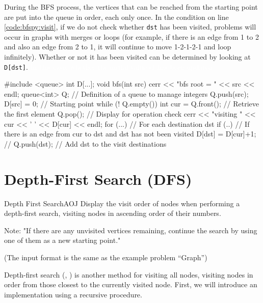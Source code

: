 During the BFS process, the vertices that can be reached from the starting point are put into the queue in order, each only once.
In the condition on line \ref{code:bfspy:visit}, if we do not check whether \texttt{dst} has been visited, problems will occur in graphs with merges or loops (for example, if there is an edge from 1 to 2 and also an edge from 2 to 1, it will continue to move 1-2-1-2-1 and loop infinitely). Whether or not it has been visited can be determined by looking at \texttt{D[dst]}. \textcolor{white}{In this case, whether the initial value -1 has been updated.}

\begin{cbox}[emph={queue,bfs,Q}]
#include <queue>
int D[...];
void bfs(int src) {
    cerr << "bfs root = " << src << endl;
    queue<int> Q; // Definition of a queue to manage integers
    Q.push(src);
    D[src] = 0; // Starting point
    while (! Q.empty()) {
        int cur = Q.front(); // Retrieve the first element
        Q.pop();
        // Display for operation check
        cerr << "visiting " << cur << ' ' << D[cur] << endl;
        for (...) { // For each destination dst
            if (..) { // If there is an edge from cur to dst and dst has not been visited
                D[dst] = D[cur]+1; // 
                Q.push(dst); // Add dst to the visit destinations
            } 
        }
    }
}  
\end{cbox}
\section{Depth-First Search (DFS)}\label{section:dfs}

\begin{psbox}{Depth First Search}{AOJ}
Display the visit order of nodes when performing a depth-first search, visiting nodes in ascending order of their numbers.

Note: "If there are any unvisited vertices remaining, continue the search by using one of them as a new starting point."

(The input format is the same as the example problem ``Graph'')

\end{psbox}

Depth-first search (\pcaojbook[pp.~273--], \pccbook[p.~33]) is another method for visiting all nodes, visiting nodes in order from those closest to the currently visited node.
First, we will introduce an implementation using a recursive procedure.

